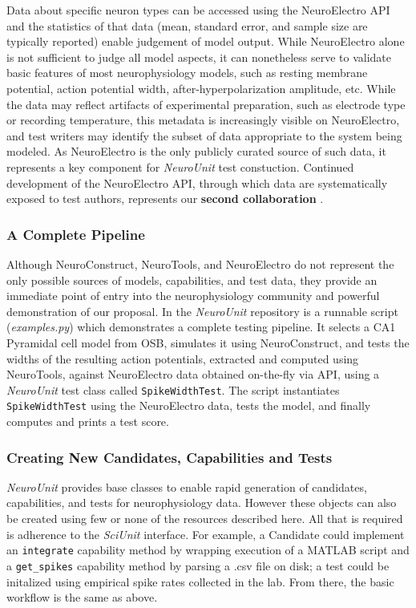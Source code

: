 \documentclass[11pt,letterpaper]{article}
\begin{document}
Data about specific neuron types can be accessed using the NeuroElectro API and the statistics of that data (mean, standard error, and sample size are typically reported) enable judgement of model output.  While NeuroElectro alone is not sufficient to judge all model aspects, it can nonetheless serve to validate basic features of most neurophysiology models, such as resting membrane potential, action potential width, after-hyperpolarization amplitude, etc.  While the data may reflect artifacts of experimental preparation, such as electrode type or recording temperature, this metadata is increasingly visible on NeuroElectro, and test writers may identify the subset of data appropriate to the system being modeled.  As NeuroElectro is the only publicly curated source of such data, it represents a key component for \textit{NeuroUnit} test constuction.  Continued development of the NeuroElectro API, through which data are systematically exposed to test authors, represents our \textbf{second collaboration} \cite{neuroelectro_dev_url}.  

\subsubsection{A Complete Pipeline}
Although NeuroConstruct, NeuroTools, and NeuroElectro do not represent the only possible sources of models, capabilities, and test data, they provide an immediate point of entry into the neurophysiology community and powerful demonstration of our proposal.  In the \textit{NeuroUnit} repository \cite{neurounit_url} is a runnable script (\textit{examples.py}) which demonstrates a complete testing pipeline.  It selects a CA1 Pyramidal cell model from OSB, simulates it using NeuroConstruct, and tests the widths of the resulting action potentials, extracted and computed using NeuroTools, against NeuroElectro data obtained on-the-fly via API, using a \textit{NeuroUnit} test class called \verb|SpikeWidthTest|.  The script instantiates \verb|SpikeWidthTest| using the NeuroElectro data, tests the model, and finally computes and prints a test score.    

\subsubsection{Creating New Candidates, Capabilities and Tests}
\textit{NeuroUnit} provides base classes to enable rapid generation of candidates, capabilities, and tests for neurophysiology data.  However these objects can also be created using few or none of the resources described here.  All that is required is adherence to the \textit{SciUnit} interface.  For example, a Candidate could implement an \verb|integrate| capability method by wrapping execution of a MATLAB script and a \verb|get_spikes| capability method by parsing a .csv file on disk; a test could be initalized using empirical spike rates collected in the lab. From there, the basic workflow is the same as above. 
\end{document}
